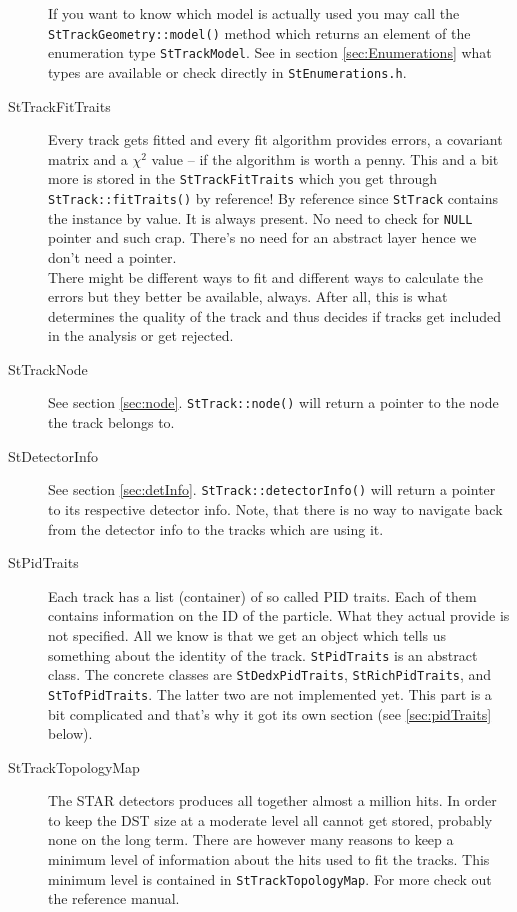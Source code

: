 \documentclass[twoside]{article}
\begin{document}
\begin{description}
    If you want to know which model is actually used you may call the
    \texttt{StTrackGeometry::model()} method which returns an element
    of the enumeration type \texttt{StTrackModel}. See in section
    \ref{sec:Enumerations} what types are available or check directly
    in \texttt{StEnumerations.h}.
    
\item[StTrackFitTraits]  Every track gets
    fitted and every fit algorithm provides errors, a covariant matrix
    and a $\chi^2$ value -- if the algorithm is worth a penny.  This
    and a bit more is stored in the \texttt{StTrackFitTraits} which
    you get through \texttt{StTrack::fitTraits()} by reference! By
    reference since \texttt{StTrack} contains the instance by value.
    It is always present. No need to check for \texttt{NULL} pointer
    and such crap. There's no need for an abstract
    layer hence we don't need a pointer.\\
    There might be different ways to fit and different ways to
    calculate the errors but they better be available, always. After
    all, this is what determines the quality of the track and thus
    decides if tracks get included in the analysis or get rejected.
    
\item[StTrackNode]  See section \ref{sec:node}.
    \texttt{StTrack::node()} will return a pointer to the node the
    track belongs to.
    
\item[StDetectorInfo]  See section
    \ref{sec:detInfo}.  \texttt{StTrack::detectorInfo()} will return a
    pointer to its respective detector info. Note, that there is no
    way to navigate back from the detector info to the tracks which
    are using it.
    
\item[StPidTraits]  Each track has a list
    (container) of so called PID traits. Each of them contains
    information on the ID of the particle. What they actual provide is
    not specified. All we know is that we get an object which tells us
    something about the identity of the track.  \texttt{StPidTraits}
    is an abstract class. The concrete classes are
    \texttt{StDedxPidTraits}, \texttt{StRichPidTraits}, and
    \texttt{StTofPidTraits}. The latter two are not implemented yet.
    This part is a bit complicated and that's why it got its own
    section (see \ref{sec:pidTraits} below).
    
\item[StTrackTopologyMap]  The STAR
    detectors produces all together almost a million hits. In order to
    keep the DST size at a moderate level all cannot get stored,
    probably none on the long term. There are however many reasons to
    keep a minimum level of information about the hits used to fit the
    tracks. This minimum level is contained in
    \texttt{StTrackTopologyMap}. For more check out the reference
    manual.
    
\end{description}
\end{document}
